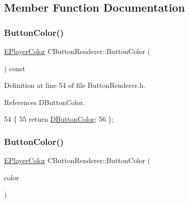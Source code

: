 \subsection{Member Function Documentation}
\hypertarget{classCButtonRenderer_a1b7adb2d7ced22c309cb497ea5e8d10c}{}\label{classCButtonRenderer_a1b7adb2d7ced22c309cb497ea5e8d10c} 
\subsubsection{\texorpdfstring{Button\+Color()}{ButtonColor()}\hspace{0.1cm}{\footnotesize\ttfamily [1/2]}}
{\footnotesize\ttfamily \hyperlink{GameDataTypes_8h_aafb0ca75933357ff28a6d7efbdd7602f}{E\+Player\+Color} C\+Button\+Renderer\+::\+Button\+Color (\begin{DoxyParamCaption}{ }\end{DoxyParamCaption}) const\hspace{0.3cm}{\ttfamily [inline]}}



Definition at line 54 of file Button\+Renderer.\+h.



References D\+Button\+Color.


\begin{DoxyCode}
54                                         \{
55             \textcolor{keywordflow}{return} \hyperlink{classCButtonRenderer_a8b2bce7400657eb1a8f896b070d11996}{DButtonColor};   
56         \};
\end{DoxyCode}
\hypertarget{classCButtonRenderer_a76037d44fb1da753bcd1447a44dba51c}{}\label{classCButtonRenderer_a76037d44fb1da753bcd1447a44dba51c} 
\subsubsection{\texorpdfstring{Button\+Color()}{ButtonColor()}\hspace{0.1cm}{\footnotesize\ttfamily [2/2]}}
{\footnotesize\ttfamily \hyperlink{GameDataTypes_8h_aafb0ca75933357ff28a6d7efbdd7602f}{E\+Player\+Color} C\+Button\+Renderer\+::\+Button\+Color (\begin{DoxyParamCaption}\item[{\hyperlink{GameDataTypes_8h_aafb0ca75933357ff28a6d7efbdd7602f}{E\+Player\+Color}}]{color }\end{DoxyParamCaption})\hspace{0.3cm}{\ttfamily [inline]}}



